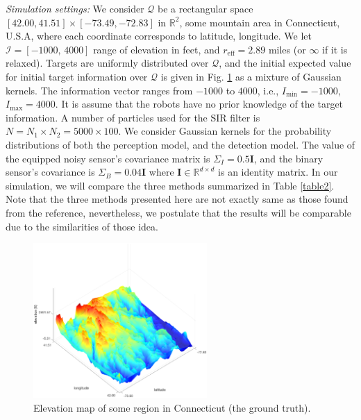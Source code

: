\documentclass[letterpaper, 10 pt, conference]{ieeeconf}
\begin{document}
\textit{Simulation settings:}
We consider  $\mathcal{Q}$ be a rectangular space $[42.00,41.51]\times [-73.49,-72.83]$ in $\mathbb{R}^2$, some mountain area in Connecticut, U.S.A, where each coordinate corresponds to latitude, longitude. We let $\mathcal{I} = [-1000,\,4000]$ range of elevation in feet, and $r_{\text{eff}} =2.89$ miles (or $\infty$ if it is relaxed). Targets are uniformly distributed over $\mathcal{Q}$, and the initial expected value for initial target information over $\mathcal{Q}$ is given in Fig. \ref{fig:fig1} as a mixture of Gaussian kernels. The information vector ranges from $-1000$ to $4000$, i.e., $I_{\min} = -1000$, $I_{\max} = 4000$.
It is assume that the robots have no prior knowledge of the target information.
A number of particles used for the SIR filter is $N= N_1\times N_2 = 5000 \times 100$. We consider Gaussian kernels for the probability distributions of both the perception model, and the detection model. The value of the equipped noisy sensor's covariance matrix is $\Sigma_I = 0.5\mathbf{I}$, and the binary sensor's covariance is $\Sigma_B = 0.04\mathbf{I}$ where $\mathbf{I} \in \mathbb{R}^{d\times d}$ is an identity matrix.
In our simulation, we will compare the three methods summarized in Table \ref{table2}. Note that the three methods presented here are not exactly same as those found from the reference, nevertheless, we postulate that the results will be comparable due to the similarities of those idea.
\begin{table}[]
	\centering
	\caption{Summary of deployment methods considered in current section:}
				\label{table2}	
	{\scriptsize
		}
\end{table}

\begin{figure}
	\centering
	\includegraphics[width=2.6in]{figure/gtruth3d}
	\caption{Elevation map of some region in Connecticut (the ground truth).} 
	\label{fig:fig1}
\end{figure}
\end{document}
